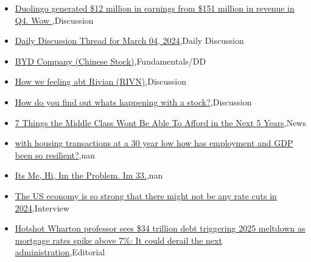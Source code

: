 \documentclass{article}%
\begin{document}
%
\begin{itemize}%
\item%
\href{https://reddit.com/r/wallstreetbets/comments/1b68kyf/duolingo\_generated\_12\_million\_in\_earnings\_from/}{Duolingo generated \$12 million in earnings from \$151 million in revenue in Q4. Wow },Discussion%
\item%
\href{https://reddit.com/r/wallstreetbets/comments/1b6887q/daily\_discussion\_thread\_for\_march\_04\_2024/}{Daily Discussion Thread for March 04, 2024},Daily Discussion%
\item%
\href{https://reddit.com/r/StockMarket/comments/1b5ubjr/byd\_company\_chinese\_stock/}{BYD Company (Chinese Stock)},Fundamentals/DD%
\item%
\href{https://reddit.com/r/StockMarket/comments/1b5ovl4/how\_we\_feeling\_abt\_rivian\_rivn/}{How we feeling abt Rivian (RIVN)},Discussion%
\item%
\href{https://reddit.com/r/StockMarket/comments/1b54v57/how\_do\_you\_find\_out\_whats\_happening\_with\_a\_stock/}{How do you find out whats happening with a stock?},Discussion%
\item%
\href{https://reddit.com/r/Economics/comments/1b666te/7\_things\_the\_middle\_class\_wont\_be\_able\_to\_afford/}{7 Things the Middle Class Wont Be Able To Afford in the Next 5 Years},News%
\item%
\href{https://reddit.com/r/Economics/comments/1b5whw5/with\_housing\_transactions\_at\_a\_30\_year\_low\_how/}{with housing transactions at a 30 year low how has employment and GDP been so resilient?},nan%
\item%
\href{https://reddit.com/r/Economics/comments/1b5rxy2/its\_me\_hi\_im\_the\_problem\_im\_33/}{Its Me, Hi, Im the Problem. Im 33.},nan%
\item%
\href{https://reddit.com/r/Economics/comments/1b5nomo/the\_us\_economy\_is\_so\_strong\_that\_there\_might\_not/}{The US economy is so strong that there might not be any rate cuts in 2024},Interview%
\item%
\href{https://reddit.com/r/Economics/comments/1b5lo2o/hotshot\_wharton\_professor\_sees\_34\_trillion\_debt/}{Hotshot Wharton professor sees \$34 trillion debt triggering 2025 meltdown as mortgage rates spike above 7\%: It could derail the next administration},Editorial%
\end{itemize}%
\end{document}
